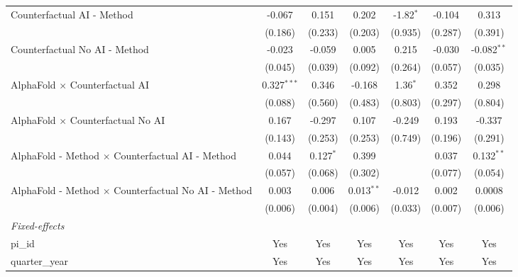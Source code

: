 \begin{tabular}{lcccccc}
   Counterfactual AI - Method                                 & -0.067         & 0.151          & 0.202        & -1.82$^{*}$   & -0.104  & 0.313\\   
                                                              & (0.186)        & (0.233)        & (0.203)      & (0.935)       & (0.287) & (0.391)\\   
   Counterfactual No AI - Method                              & -0.023         & -0.059         & 0.005        & 0.215         & -0.030  & -0.082$^{**}$\\   
                                                              & (0.045)        & (0.039)        & (0.092)      & (0.264)       & (0.057) & (0.035)\\   
   AlphaFold $\times$ Counterfactual AI                       & 0.327$^{***}$  & 0.346          & -0.168       & 1.36$^{*}$    & 0.352   & 0.298\\   
                                                              & (0.088)        & (0.560)        & (0.483)      & (0.803)       & (0.297) & (0.804)\\   
   AlphaFold $\times$ Counterfactual No AI                    & 0.167          & -0.297         & 0.107        & -0.249        & 0.193   & -0.337\\   
                                                              & (0.143)        & (0.253)        & (0.253)      & (0.749)       & (0.196) & (0.291)\\   
   AlphaFold - Method $\times$ Counterfactual AI - Method     & 0.044          & 0.127$^{*}$    & 0.399        &               & 0.037   & 0.132$^{**}$\\   
                                                              & (0.057)        & (0.068)        & (0.302)      &               & (0.077) & (0.054)\\   
   AlphaFold - Method $\times$ Counterfactual No AI - Method  & 0.003          & 0.006          & 0.013$^{**}$ & -0.012        & 0.002   & 0.0008\\   
                                                              & (0.006)        & (0.004)        & (0.006)      & (0.033)       & (0.007) & (0.006)\\   
   \midrule
   \emph{Fixed-effects}\\
   pi\_id                                                     & Yes            & Yes            & Yes          & Yes           & Yes     & Yes\\  
   quarter\_year                                              & Yes            & Yes            & Yes          & Yes           & Yes     & Yes\\  

\end{tabular}
